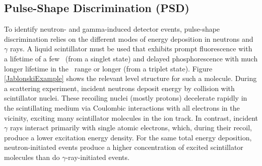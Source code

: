 \subsection{Pulse-Shape Discrimination (PSD)}
To identify neutron- and gamma-induced detector events, pulse-shape discrimination
relies on the different modes of energy deposition in neutrons and $\gamma$ rays.
A liquid scintillator must be used that exhibits prompt fluorescence with a
lifetime of a few \nano\second\ (from a singlet
state) and delayed phosphorescence with much longer lifetime in the
\micro\second\ range or longer (from a triplet state). Figure \ref{JablonskiExample} shows the
relevant level structure for such a molecule. During a scattering experiment,
incident neutrons deposit energy by collision with scintillator nuclei.
These recoiling nuclei (mostly protons) decelerate rapidly in the scintillating
medium via Coulombic interactions with all electrons in the vicinity,
exciting many scintillator molecules in the
ion track. In contrast, incident $\gamma$ rays interact primarily with
single atomic electrons, which, during their recoil, produce a lower excitation energy density.
For the same total energy deposition,
neutron-initiated events produce a higher 
concentration of excited scintillator molecules than do $\gamma$-ray-initiated
events.


